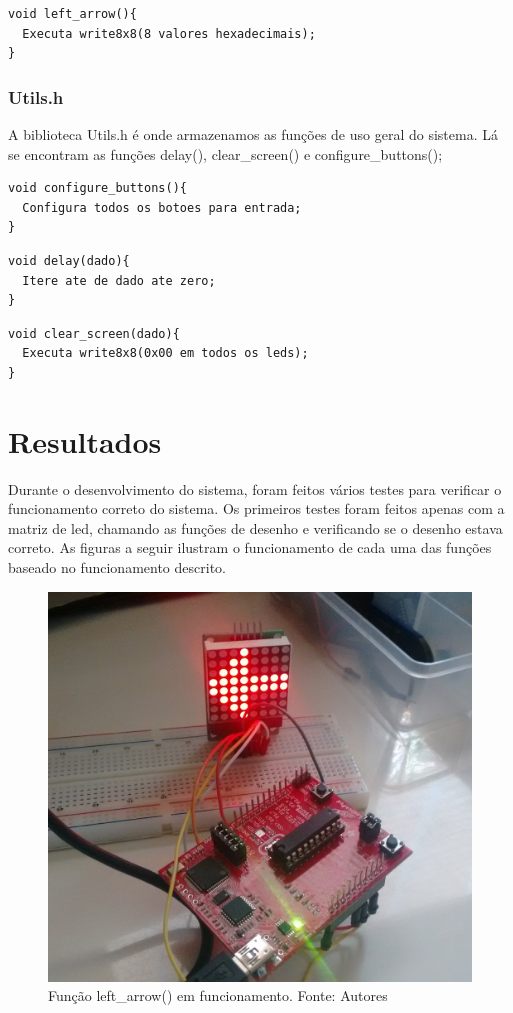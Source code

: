 \documentclass[conference]{IEEEtran}
\begin{document}
\begin{lstlisting}
void left_arrow(){
  Executa write8x8(8 valores hexadecimais);
}
\end{lstlisting}

\subsubsection{Utils.h}
A biblioteca Utils.h é onde armazenamos as funções de uso geral do sistema. Lá
se encontram as funções delay(), clear\_screen() e configure\_buttons();
\begin{lstlisting}
void configure_buttons(){
  Configura todos os botoes para entrada;
}
\end{lstlisting}

\begin{lstlisting}
void delay(dado){
  Itere ate de dado ate zero;
}
\end{lstlisting}

\begin{lstlisting}
void clear_screen(dado){
  Executa write8x8(0x00 em todos os leds);
}
\end{lstlisting}


\section{Resultados}
Durante o desenvolvimento do sistema, foram feitos vários testes para verificar o funcionamento correto do sistema. Os primeiros testes foram feitos apenas com a matriz de led, chamando as funções de desenho e verificando se o desenho estava correto. As figuras a seguir ilustram o funcionamento de cada uma das funções baseado no funcionamento descrito.

\begin{figure}[H]
  \centering
  \includegraphics[width=0.5\linewidth]{esq}
  \caption{Função left\_arrow() em funcionamento. Fonte: Autores}
  \label{fig:esq}
\end{figure}
\end{document}
